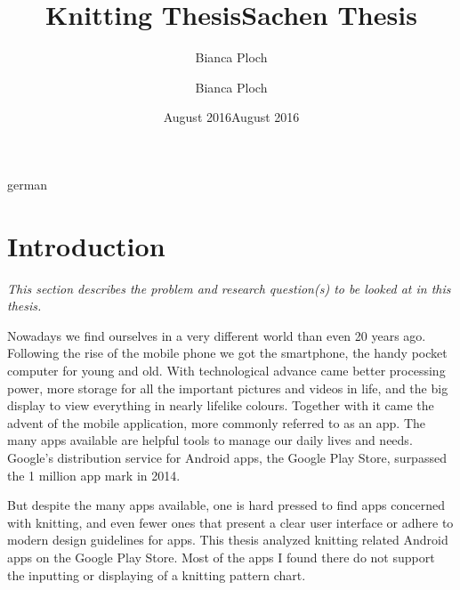 \documentclass[a4paper,11pt]{kth-mag}
\title{Knitting Thesis}
\author{Bianca Ploch}
\date{August 2016}
\begin{document}
\frontmatter
\pagestyle{empty}
\removepagenumbers
\maketitle
{}
\begin{abstract}

\end{abstract}
\clearpage

\title{Sachen Thesis}
\author{Bianca Ploch}
\date{August 2016}
\maketitle

\begin{foreignabstract}{german}

\end{foreignabstract}
\clearpage

\tableofcontents*
\mainmatter


\pagestyle{newchap}
\chapter{Introduction}
\textit{This section describes the problem and research question(s) to be looked at in
this thesis.}

Nowadays we find ourselves in a very different world than even 20 years ago.
Following the rise of the mobile phone we got the smartphone, the handy pocket
computer for young and old. With technological advance came better processing
power, more storage for all the important pictures and videos in life, and the
big display to view everything in nearly lifelike colours. Together with it came
 the advent of the mobile application, more commonly referred to as an app. The
 many apps available are helpful tools to manage our daily lives and needs.
 Google’s distribution service for Android apps, the Google Play Store,
 surpassed the 1 million app mark in 2014.

But despite the many apps available, one is hard pressed to find apps concerned
with knitting, and even fewer ones that present a clear user interface or adhere
to modern design guidelines for apps. This thesis analyzed knitting related
Android apps on the Google Play Store. Most of the apps I found there do not
support the inputting or displaying of a knitting pattern chart.
\end{document}
